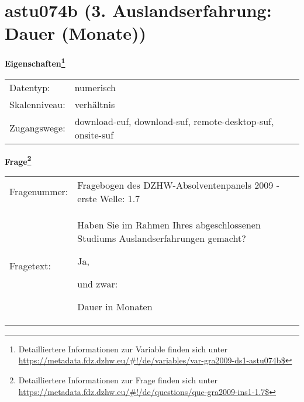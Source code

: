 
    \setcounter{footnote}{0}

    \vspace*{-1.8cm}
	\section{astu074b (3. Auslandserfahrung: Dauer (Monate))}
	\label{section:astu074b}



    \vspace*{0.5cm}
    \noindent\textbf{Eigenschaften\footnote{Detailliertere Informationen zur Variable finden sich unter
		\url{https://metadata.fdz.dzhw.eu/\#!/de/variables/var-gra2009-ds1-astu074b$}}}\\
	\begin{tabularx}{\hsize}{@{}lX}
	Datentyp: & numerisch \\
	Skalenniveau: & verhältnis \\
	Zugangswege: &
	  download-cuf, 
	  download-suf, 
	  remote-desktop-suf, 
	  onsite-suf
 \\
    \end{tabularx}



				\vspace*{0.5cm}
                \noindent\textbf{Frage\footnote{Detailliertere Informationen zur Frage finden sich unter
		              \url{https://metadata.fdz.dzhw.eu/\#!/de/questions/que-gra2009-ins1-1.7$}}}\\
				\begin{tabularx}{\hsize}{@{}lX}
					Fragenummer: &
					  Fragebogen des DZHW-Absolventenpanels 2009 - erste Welle:
					  1.7
 \\
					Fragetext: & Haben Sie im Rahmen Ihres abgeschlossenen Studiums Auslandserfahrungen gemacht?\par  Ja,\par  und zwar:\par  Dauer in Monaten \\
				\end{tabularx}





